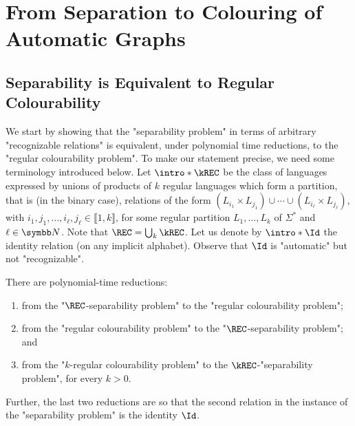 \section{%
	\AP\label{sec:dichotomy-colouring}%
	From Separation to Colouring of Automatic Graphs
}

\subsection{Separability is Equivalent to Regular Colourability}

We start by showing that the "separability problem" in terms of arbitrary "recognizable relations" is equivalent, under polynomial time reductions, 
to the "regular colourability problem". To make our statement precise, we need some terminology introduced below. 
\AP
Let $\intro*\kREC$ be the class of languages expressed by unions of products of $k$ regular languages which form a partition, that is (in the binary case), relations of the form $(L_{i_1} \times L_{j_1}) \cup \dotsb \cup (L_{i_\ell} \times L_{j_\ell})$, with $i_1,j_1,\hdots,i_\ell, j_\ell \in \lBrack 1,k \rBrack$, for some regular partition $L_1, \dotsc, L_{k}$ of $\Sigma^*$ and $\ell \in \N$.
\AP
Note that $\REC = \bigcup_k \kREC$.
\AP%
Let us denote by $\intro*\Id$ the identity relation (on any implicit alphabet). Observe that $\Id$ is "automatic" but not "recognizable".

\begin{theorem}
    \AP\label{thm:reg-colourability-equiv-separability}
    There are polynomial-time reductions: 
    \begin{enumerate}
        \item from the "$\REC$-separability problem" to the "regular colourability problem"; 
        \item from the "regular colourability problem" to the "$\REC$-separability problem"; and
        \item from the "$k$-regular colourability problem" to the $\kREC$-"separability problem", for every $k > 0$.
    \end{enumerate}
    Further, the last two reductions are so that the second relation in the instance of the "separability problem" is the identity $\Id$.
\end{theorem}


